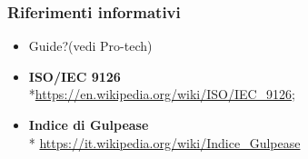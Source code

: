 \subsubsection{Riferimenti informativi}
\begin{itemize}
\item Guide?(vedi Pro-tech)
\item \textbf{ISO/IEC 9126} \\*\href{https://en.wikipedia.org/wiki/ISO/IEC_9126}{https://en.wikipedia.org/wiki/ISO/IEC\_9126};
\item \textbf{Indice di Gulpease} \\* \href{https://it.wikipedia.org/wiki/Indice_Gulpease}{https://it.wikipedia.org/wiki/Indice\_Gulpease}
\end{itemize}